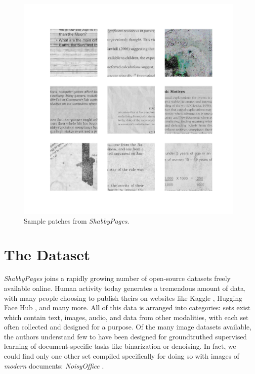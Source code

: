 \documentclass[runningheads]{llncs}
\begin{document}
\begin{figure}
\centering
\includegraphics[width=0.98\columnwidth, frame]{figures/matrix.png}
\caption{Sample patches from \emph{ShabbyPages}.} \label{fig1}
\end{figure}

\section{The Dataset}
\emph{ShabbyPages} joins a rapidly growing number of open-source datasets freely available online.
Human activity today generates a tremendous amount of data, with many people choosing to publish theirs on websites like Kaggle \cite{ref_Kaggle}, Hugging Face Hub \cite{ref_HuggingFaceHub}, and many more.
All of this data is arranged into categories: sets exist which contain text, images, audio, and data from other modalities, with each set often collected and designed for a purpose.
Of the many image datasets available, the authors understand few to have been designed for groundtruthed supervised learning of document-specific tasks like binarization or denoising.
In fact, we could find only one other set compiled specifically for doing so with images of \textit{modern} documents: \emph{NoisyOffice} \cite{ref_NoisyOffice}.
\end{document}
